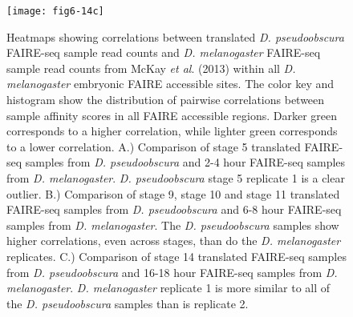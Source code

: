\begin{figure}[H]
\centering
\texttt{[image: fig6-14c]}
\caption{Heatmaps showing correlations between translated \emph{D. pseudoobscura} FAIRE-seq sample read counts and \emph{D. melanogaster} FAIRE-seq sample read counts from McKay \emph{et al}. (2013) within all \emph{D. melanogaster} embryonic FAIRE accessible sites. The color key and histogram show the distribution of pairwise correlations between sample affinity scores in all FAIRE accessible regions. Darker green corresponds to a higher correlation, while lighter green corresponds to a lower correlation. A.) Comparison of stage 5 translated FAIRE-seq samples from \emph{D. pseudoobscura} and 2-4 hour FAIRE-seq samples from \emph{D. melanogaster}. \emph{D. pseudoobscura} stage 5 replicate 1 is a clear outlier. B.) Comparison of stage 9, stage 10 and stage 11 translated FAIRE-seq samples from \emph{D. pseudoobscura} and 6-8 hour FAIRE-seq samples from \emph{D. melanogaster}. The \emph{D. pseudoobscura} samples show higher correlations, even across stages, than do the \emph{D. melanogaster} replicates. C.) Comparison of stage 14 translated FAIRE-seq samples from \emph{D. pseudoobscura} and 16-18 hour FAIRE-seq samples from \emph{D. melanogaster}. \emph{D. melanogaster} replicate 1 is more similar to all of the \emph{D. pseudoobscura} samples than is replicate 2.}
\label{Figure 6.14}
\end{figure}

